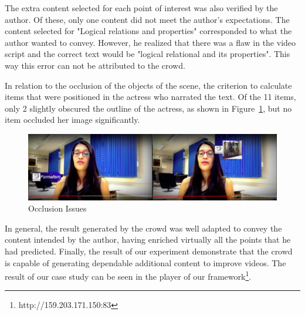The extra content selected for each point of interest was also verified by the author. Of these, only one content did not meet the author's expectations. The content selected for "Logical relations and properties" corresponded to what the author wanted to convey. However, he realized that there was a flaw in the video script and the correct text would be "logical relational and its properties". This way this error can not be attributed to the crowd.

In relation to the occlusion of the objects of the scene, the criterion to calculate items that were positioned in the actress who narrated the text. Of the 11 items, only 2 slightly obscured the outline of the actress, as shown in Figure~\ref{oclusion}, but no item occluded her image significantly.

\begin{figure}[h!]
	\centerline{\includegraphics[scale=0.19] {figure/occlusion}}
	\caption{Occlusion Issues}
	\label{oclusion}
\end{figure}

In general, the result generated by the crowd was well adapted to convey the content intended by the author, having enriched virtually all the points that he had predicted. Finally, the result of our experiment demonstrate that the crowd is capable of generating dependable additional content to improve videos. The result of our case study can be seen in the player of our framework\footnote{http://159.203.171.150:83}.



















